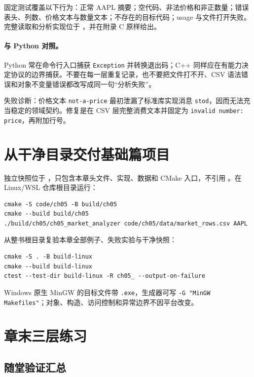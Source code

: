 固定测试覆盖以下行为：正常 AAPL 摘要；空代码、非法价格和非正数量；错误表头、列数、价格文本与数量文本；不存在的目标代码；usage 与文件打开失败。完整读取和分析实现位于 ，并在附录 C 原样给出。

\paragraph{与 Python 对照。}
Python 常在命令行入口捕获 \texttt{Exception} 并转换退出码；C++ 同样应在有能力决定协议的边界捕获。不要在每一层重复记录，也不要把文件打不开、CSV 语法错误和对象不变量错误都改写成同一句“分析失败”。

失败诊断：价格文本 \texttt{not-a-price} 最初泄漏了标准库实现消息 \texttt{stod}，因而无法充当稳定的领域契约。修复是在 CSV 层完整消费文本并固定为 \texttt{invalid number: price}，再附加行号。

\section{从干净目录交付基础篇项目}

独立快照位于 ，只包含本章头文件、实现、数据和 CMake 入口，不引用 。在 Linux/WSL 仓库根目录运行：

\begin{lstlisting}
cmake -S code/ch05 -B build/ch05
cmake --build build/ch05
./build/ch05/ch05_market_analyzer code/ch05/data/market_rows.csv AAPL
\end{lstlisting}

从整书根目录复验本章全部例子、失败实验与干净快照：

\begin{lstlisting}
cmake -S . -B build-linux
cmake --build build-linux
ctest --test-dir build-linux -R ch05_ --output-on-failure
\end{lstlisting}

Windows 原生 MinGW 的目标文件带 \texttt{.exe}，生成器可写 \texttt{-G "MinGW Makefiles"}；对象、构造、访问控制和异常边界不因平台改变。

\section{章末三层练习}

\subsection*{随堂验证汇总}

